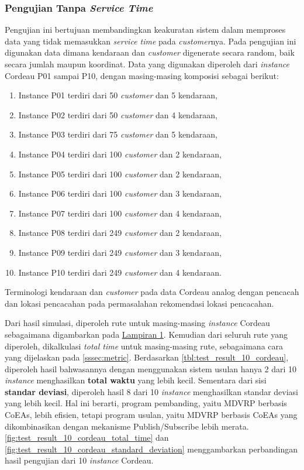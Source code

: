\subsubsection{Pengujian Tanpa \textit{Service Time}}
Pengujian ini bertujuan membandingkan keakuratan sistem dalam memproses data yang tidak memasukkan \textit{service time} pada \textit{customer}nya. Pada pengujian ini digunakan data dimana kendaraan dan \textit{customer} digenerate secara random, baik secara jumlah maupun koordinat. Data yang digunakan diperoleh dari \textit{instance} Cordeau P01 sampai P10, dengan masing-masing komposisi sebagai berikut:


\begin{enumerate}
	\item Instance P01 terdiri dari 50 \textit{customer} dan 5 kendaraan,
	\item Instance P02 terdiri dari 50 \textit{customer} dan 4 kendaraan, 
	\item Instance P03 terdiri dari 75 \textit{customer} dan 5 kendaraan, 
	\item Instance P04 terdiri dari 100 \textit{customer} dan 2 kendaraan, 
	\item Instance P05 terdiri dari 100 \textit{customer} dan 2 kendaraan, 
	\item Instance P06 terdiri dari 100 \textit{customer} dan 3 kendaraan, 
	\item Instance P07 terdiri dari 100 \textit{customer} dan 4 kendaraan, 
	\item Instance P08 terdiri dari 249 \textit{customer} dan 2 kendaraan, 
	\item Instance P09 terdiri dari 249 \textit{customer} dan 3 kendaraan, 
	\item Instance P10 terdiri dari 249 \textit{customer} dan 4 kendaraan.
\end{enumerate}
Terminologi kendaraan dan \textit{customer} pada data Cordeau analog dengan pencacah dan lokasi pencacahan pada permasalahan rekomendasi lokasi pencacahan.


Dari hasil simulasi, diperoleh rute untuk masing-masing \textit{instance} Cordeau sebagaimana digambarkan pada \hyperref[ch:test_result_cordeau_notw]{Lampiran 1}. Kemudian dari seluruh rute yang diperoleh, dikalkulasi \textit{total time} untuk masing-masing rute, sebagaimana cara yang dijelaskan pada \autoref{sssec:metric}. Berdasarkan \autoref{tbl:test_result_10_cordeau}, diperoleh hasil bahwasannya dengan menggunakan sistem usulan hanya 2 dari 10 \textit{instance} menghasilkan \textbf{total waktu} yang lebih kecil. Sementara dari sisi \textbf{standar deviasi}, diperoleh hasil 8 dari 10 \textit{instance} menghasilkan standar deviasi yang lebih kecil. Hal ini berarti, program pembanding, yaitu MDVRP berbasis CoEAs, lebih efisien, tetapi program usulan, yaitu MDVRP berbasis CoEAs yang dikombinasikan dengan mekanisme Publish/Subscribe lebih merata. \autoref{fig:test_result_10_cordeau_total_time} dan \autoref{fig:test_result_10_cordeau_standard_deviation} menggambarkan perbandingan hasil pengujian dari 10 \textit{instance} Cordeau.


